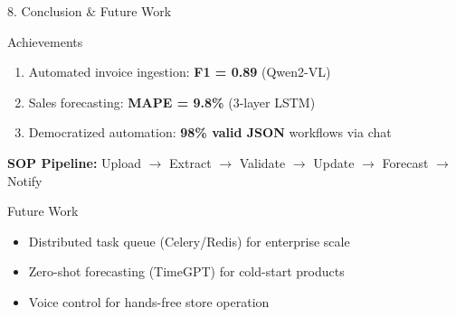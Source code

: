 \documentclass[10pt]{beamer}
\begin{document}
\begin{frame}{8. Conclusion \& Future Work}
    \begin{block}{Achievements}
        \begin{enumerate}
            \item Automated invoice ingestion: \textbf{F1 = 0.89} (Qwen2-VL)
            \item Sales forecasting: \textbf{MAPE = 9.8\%} (3-layer LSTM)
            \item Democratized automation: \textbf{98\% valid JSON} workflows via chat
        \end{enumerate}
    \end{block}

    \textbf{SOP Pipeline:}
    Upload $\rightarrow$ Extract $\rightarrow$ Validate $\rightarrow$ Update $\rightarrow$ Forecast $\rightarrow$ Notify

    \vspace{0.3cm}
    \begin{block}{Future Work}
        \begin{itemize}
            \item Distributed task queue (Celery/Redis) for enterprise scale
            \item Zero-shot forecasting (TimeGPT) for cold-start products
            \item Voice control for hands-free store operation
        \end{itemize}
    \end{block}
\end{frame}
\end{document}
